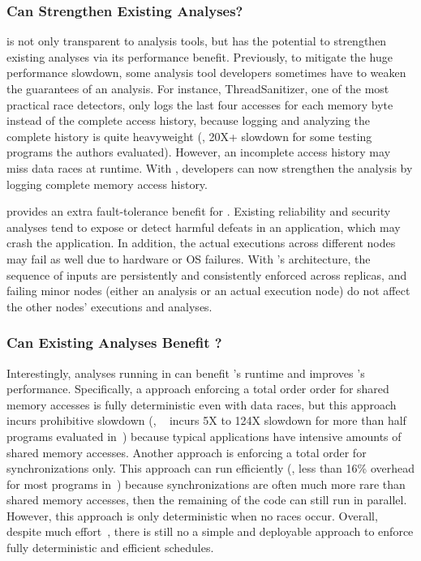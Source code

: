 \subsubsection{Can \xxx Strengthen Existing Analyses?} 
\label{sec:strengthen-analysis}

\xxx is not only transparent to analysis tools, but has the potential to 
strengthen existing analyses via its performance benefit. Previously, to 
mitigate the huge performance slowdown, some analysis tool developers sometimes 
have to weaken the guarantees of an analysis. For instance, 
ThreadSanitizer\cite{tsan}, one of the most practical race detectors, only 
logs the last four accesses for each memory byte instead of the complete access 
history, because logging and analyzing the complete history is quite 
heavyweight (\eg, 20X+ slowdown for some testing programs the authors 
evaluated). However, an incomplete access history may miss data races at 
runtime. With \xxx, developers can now strengthen the analysis by logging 
complete memory access history.

\smr provides an extra fault-tolerance benefit for \xxx. Existing 
reliability and security analyses tend to expose or detect harmful defeats in 
an application, which may crash the application. In addition, the actual 
executions across different nodes may fail as well due to hardware or OS 
failures. With \xxx's \smr architecture, the sequence of inputs are 
persistently and consistently enforced across replicas, and failing minor 
nodes (either an analysis or an actual execution node) do not affect the other 
nodes' executions and analyses.

\subsubsection{Can Existing Analyses Benefit \xxx?} 
\label{sec:strengthen-crane}

Interestingly, analyses running in \xxx can benefit \xxx's \dmt runtime and 
improves \xxx's performance. Specifically, a \dmt approach enforcing a total 
order order for shared memory accesses is fully deterministic even with data 
races, but this approach incurs prohibitive slowdown (\eg, 
\dthreads~\cite{dthreads:sosp11} incurs 5X to 124X slowdown for more than half 
programs evaluated in~\cite{parrot:sosp13}) because typical applications have 
intensive amounts of shared memory accesses. Another \dmt approach is enforcing 
a total order for synchronizations only. This approach can run efficiently 
(\eg, less than 16\% overhead for most programs in~\cite{kendo:asplos09, 
cui:tern:osdi10, parrot:sosp13}) because synchronizations are often much more 
rare than shared memory accesses, then the remaining of the code can still run 
in parallel. However, this \dmt approach is only deterministic when no races 
occur. Overall, despite much effort~\cite{dthreads:sosp11, peregrine:sosp11, 
determinator:osdi10}, there is still no a simple and deployable approach to 
enforce fully deterministic and efficient \dmt schedules.


